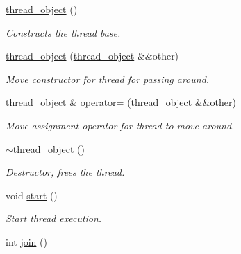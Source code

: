 \begin{DoxyCompactItemize}
\item 
\mbox{\label{classcpen333_1_1thread_1_1thread__object_a1e15fda903a0e1bbc0c06fc7d870d0d9}} 
\hyperlink{classcpen333_1_1thread_1_1thread__object_a1e15fda903a0e1bbc0c06fc7d870d0d9}{thread\+\_\+object} ()
\begin{DoxyCompactList}\small\item\em Constructs the thread base. \end{DoxyCompactList}\item 
\hyperlink{classcpen333_1_1thread_1_1thread__object_adb6e805de4cf351471b100fe18254255}{thread\+\_\+object} (\hyperlink{classcpen333_1_1thread_1_1thread__object}{thread\+\_\+object} \&\&other)
\begin{DoxyCompactList}\small\item\em Move constructor for thread for passing around. \end{DoxyCompactList}\item 
\hyperlink{classcpen333_1_1thread_1_1thread__object}{thread\+\_\+object} \& \hyperlink{classcpen333_1_1thread_1_1thread__object_acae4bff517bb0a97e5f52820d99d3a5d}{operator=} (\hyperlink{classcpen333_1_1thread_1_1thread__object}{thread\+\_\+object} \&\&other)
\begin{DoxyCompactList}\small\item\em Move assignment operator for thread to move around. \end{DoxyCompactList}\item 
\mbox{\label{classcpen333_1_1thread_1_1thread__object_addcca372aa82c04d454ade7fd60d1e75}} 
\hyperlink{classcpen333_1_1thread_1_1thread__object_addcca372aa82c04d454ade7fd60d1e75}{$\sim$thread\+\_\+object} ()
\begin{DoxyCompactList}\small\item\em Destructor, frees the thread. \end{DoxyCompactList}\item 
void \hyperlink{classcpen333_1_1thread_1_1thread__object_ae4484909a3f4418c0c0db318d615bde1}{start} ()
\begin{DoxyCompactList}\small\item\em Start thread execution. \end{DoxyCompactList}\item 
int \hyperlink{classcpen333_1_1thread_1_1thread__object_ac7334918eabfcf855cec00ed2a68a039}{join} ()

\end{DoxyCompactItemize}
